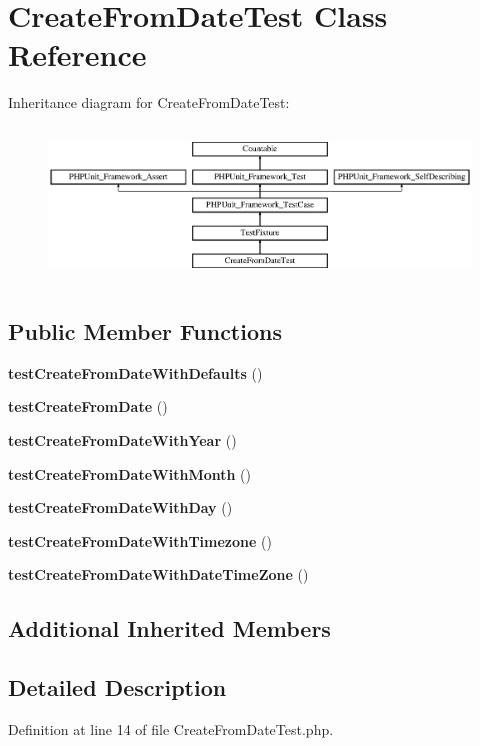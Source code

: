 \section{Create\+From\+Date\+Test Class Reference}
\label{class_create_from_date_test}
Inheritance diagram for Create\+From\+Date\+Test\+:\begin{figure}[H]
\begin{center}
\leavevmode
\includegraphics[height=4.129793cm]{class_create_from_date_test}
\end{center}
\end{figure}
\subsection*{Public Member Functions}
\begin{DoxyCompactItemize}
\item 
{\bf test\+Create\+From\+Date\+With\+Defaults} ()
\item 
{\bf test\+Create\+From\+Date} ()
\item 
{\bf test\+Create\+From\+Date\+With\+Year} ()
\item 
{\bf test\+Create\+From\+Date\+With\+Month} ()
\item 
{\bf test\+Create\+From\+Date\+With\+Day} ()
\item 
{\bf test\+Create\+From\+Date\+With\+Timezone} ()
\item 
{\bf test\+Create\+From\+Date\+With\+Date\+Time\+Zone} ()
\end{DoxyCompactItemize}
\subsection*{Additional Inherited Members}


\subsection{Detailed Description}


Definition at line 14 of file Create\+From\+Date\+Test.\+php.




